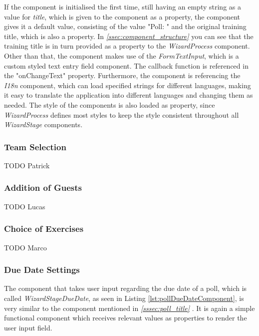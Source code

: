 If the component is initialised the first time, still having an empty string as a value for \textit{title}, which is given to the component as a property, the component gives it a default value, consisting of the value "Poll: " and the original training title, which is also a property. In \textit{\ref{ssec:component_structure} } you can see that the training title is in turn provided as a property to the \textit{WizardProcess} component.
\newline
Other than that, the component makes use of the \textit{FormTextInput}, which is a custom styled text entry field component. The callback function is referenced in the "onChangeText" property. Furthermore, the component is referencing the \textit{I18n} component, which can load specified strings for different languages, making it easy to translate the application into different languages and changing them as needed. The style of the components is also loaded as property, since \textit{WizardProcess} defines most styles to keep the style consistent throughout all \textit{WizardStage} components.

\subsubsection{Team Selection}
\label{sssec:poll_team}

TODO Patrick

\subsubsection{Addition of Guests}
\label{sssec:poll_guests}

TODO Lucas

\subsubsection{Choice of Exercises}
\label{sssec:poll_exercises}

TODO Marco

\subsubsection{Due Date Settings}
\label{sssec:poll_due_date}

The component that takes user input regarding the due date of a poll, which is called \textit{WizardStageDueDate}, as seen in Listing \ref{lst:pollDueDateComponent}, is very similar to the component mentioned in \textit{\ref{sssec:poll_title} }. It is again a simple functional component which receives relevant values as properties to render the user input field.

